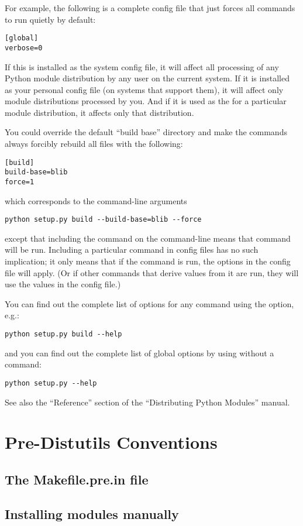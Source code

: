 \documentclass{howto}
\begin{document}
For example, the following is a complete config file that just forces
all commands to run quietly by default:
\begin{verbatim}
[global]
verbose=0
\end{verbatim}

If this is installed as the system config file, it will affect all
processing of any Python module distribution by any user on the current
system.  If it is installed as your personal config file (on systems
that support them), it will affect only module distributions processed
by you.  And if it is used as the  for a particular
module distribution, it affects only that distribution.

You could override the default ``build base'' directory and make the
 commands always forcibly rebuild all files with the
following:
\begin{verbatim}
[build]
build-base=blib
force=1
\end{verbatim}
which corresponds to the command-line arguments
\begin{verbatim}
python setup.py build --build-base=blib --force
\end{verbatim}
except that including the  command on the command-line
means that command will be run.  Including a particular command in
config files has no such implication; it only means that if the command
is run, the options in the config file will apply.  (Or if other
commands that derive values from it are run, they will use the values in
the config file.)

You can find out the complete list of options for any command using the
 option, e.g.:
\begin{verbatim}
python setup.py build --help
\end{verbatim}
and you can find out the complete list of global options by using
 without a command:
\begin{verbatim}
python setup.py --help
\end{verbatim}
See also the ``Reference'' section of the ``Distributing Python
Modules'' manual.


\section{Pre-Distutils Conventions}
\label{pre-distutils}


\subsection{The Makefile.pre.in file}
\label{makefile-pre-in}


\subsection{Installing modules manually}
\label{manual-install}
\end{document}
